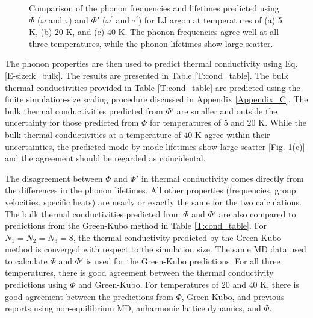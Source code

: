\documentclass[aps,prb,preprint,superscriptaddress,amsmath,amssymb,floatfix]{revtex4}
\begin{document}
\begin{figure}
\begin{center}
\end{center}
\caption{\label{F:FREQ_LIFE_LJ} Comparison of the phonon frequencies and lifetimes predicted using $\Phi$ ($\omega$ and $\tau$) and $\Phi'$ ($\omega^{'}$ and $\tau^{'}$) for LJ argon at temperatures of (a) 5 K, (b) 20 K, and (c) 40 K. The phonon frequencies agree well at all three temperatures, while the phonon lifetimes show large scatter.}
\end{figure}



The phonon properties are then used to predict thermal conductivity using Eq$.$ \eqref{E-size:k_bulk}. The results are presented in Table \ref{T:cond_table}. The bulk thermal conductivities provided in Table \ref{T:cond_table} are predicted using the finite simulation-size scaling procedure discussed in Appendix \ref{Appendix_C}. The bulk thermal conductivities predicted from $\Phi'$ are smaller and outside the uncertainty for those predicted from $\Phi$ for temperatures of $5$ and $20$ K. While the bulk thermal conductivities at a temperature of $40$ K agree within their uncertainties, the predicted mode-by-mode lifetimes show large scatter [Fig$.$ \ref{F:FREQ_LIFE_LJ}(c)] and the agreement should be regarded as coincidental.

The disagreement between $\Phi$ and $\Phi'$ in thermal conductivity comes directly from the differences in the phonon lifetimes. All other properties (frequencies, group velocities, specific heats) are nearly or exactly the same for the two calculations. The bulk thermal conductivities predicted from $\Phi$ and $\Phi'$ are also compared to predictions from the Green-Kubo method\cite{mcquarrie2000} in Table \ref{T:cond_table}. For $N_1=N_2=N_3=8$, the thermal conductivity predicted by the Green-Kubo method is converged with respect to the simulation size.\cite{mcgaughey2004c} The same MD data used to calculate $\Phi$ and $\Phi'$ is used for the Green-Kubo predictions. For all three temperatures, there is good agreement between the thermal conductivity predictions using $\Phi$ and Green-Kubo. For temperatures of $20$ and $40$ K, there is good agreement between the predictions from $\Phi$, Green-Kubo, and previous reports using non-equilibrium MD, anharmonic lattice dynamics, and $\Phi$.\cite{turney2009a}
\end{document}
